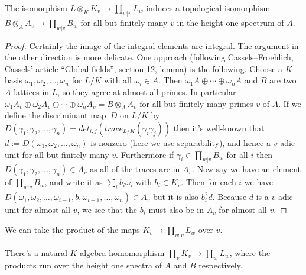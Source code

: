 \begin{theorem}
  \label{IsDedekindDomain.HeightOneSpectrum.adicCompletionComapAlgEquiv_integral}
  The isomorphism $L\otimes_KK_v\to\prod_{w|v}L_w$ induces a topological isomorphism
  $B\otimes_AA_v\to \prod_{w|v}B_w$
  for all but finitely many $v$ in the height one spectrum of $A$.
\end{theorem}
\begin{proof}
  Certainly the image of the integral elements are integral. The argument in the other
  direction is more delicate. One approach (following Cassels--Froehlich, Cassels' article
  ``Global fields'', section 12, lemma) is the following. Choose a $K$-basis
  $\omega_1,\omega_2,\ldots,\omega_n$ for $L/K$ with all $\omega_i\in A$.
  Then $\omega_1A\oplus\cdots\oplus\omega_nA$ and
  $B$ are two $A$-lattices in $L$, so they agree at almost all primes. In particular
  $\omega_1A_v\oplus\omega_2A_v\oplus\cdots\oplus\omega_nA_v=B\otimes_AA_v$ for all but
  finitely many primes $v$ of $A$. If we define the discriminant map~$D$ on $L/K$
  by $D(\gamma_1,\gamma_2,\ldots,\gamma_n)=det_{i,j}(trace_{L/K}(\gamma_i\gamma_j))$
  then it's well-known that $d:=D(\omega_1,\omega_2,\ldots,\omega_n)$ is nonzero (here we use
  separability), and hence a $v$-adic unit for all but finitely many $v$. Furthermore if
  $\gamma_i\in \prod_{w|v}B_w$ for all $i$ then $D(\gamma_1,\gamma_2,\ldots,\gamma_n)\in A_v$
  as all of the traces are in $A_v$. Now say
  we have an element of $\prod_{w|v}B_w$, and write it as $\sum_i b_i\omega_i$ with
  $b_i\in K_v$. Then for each $i$ we have
  $D(\omega_1,\omega_2,\ldots,\omega_{i-1},b,\omega_{i+1},\ldots,\omega_n)\in A_v$
  but it is also $b_i^2d$. Because $d$ is a $v$-adic unit for almost all $v$, we
  see that the $b_i$ must also be in $A_v$ for almost all $v$.
\end{proof}

We can take the product of the maps $K_v\to\prod_{w|v}L_w$ over $v$.

\begin{definition}
  \label{DedekindDomain.ProdAdicCompletions.baseChange}
  There's a natural $K$-algebra homomorphism $\prod_v K_v\to\prod_w L_w$, where the
  products run over the height one spectra of $A$ and $B$ respectively.
\end{definition}

